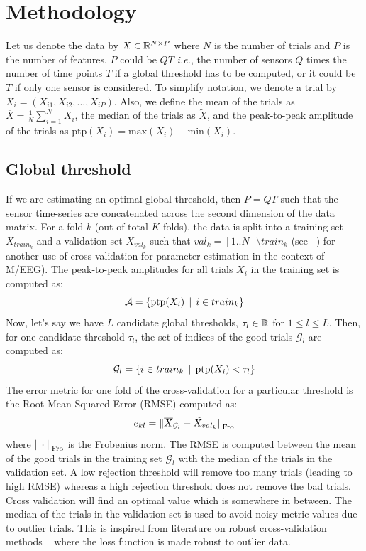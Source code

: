 \section{Methodology}
\label{sec:pagestyle}
Let us denote the data by $X \in \mathbb{R}^{N \times P}$ where $N$ is the number of trials  and $P$ is the number of features. $P$ could be $QT$ \textit{i.e.}, the number of sensors $Q$ times the number of time points $T$ if a global threshold has to be computed, or it could be $T$ if only one sensor is considered. To simplify notation, we denote a trial by $X_{i} = (X_{i1}, X_{i2}, ..., X_{iP})$. Also, we define the mean of the trials as  $\overline{X} = \frac{1}{N} \sum_{i=1}^{N} X_{i}$, the median of the trials as $\widetilde{X}$, and the peak-to-peak amplitude of the trials as  $\mathrm{ptp}(X_i) = \mathrm{max}(X_i) - \mathrm{min}(X_i)$.

\subsection{Global threshold}
\label{sec:cv_basic}
If we are estimating an optimal global threshold, then $P=QT$ such that the sensor time-series are concatenated across the second dimension of the data matrix. For a fold $k$ (out of total $K$ folds), the data is split into a training set $X_{{train}_{k}}$ and a validation set $X_{{val}_{k}}$ such that ${val}_{k} = [1 .. N] \setminus {train}_{k}$  (see ~\citep{Engemann2015328}) for another use of cross-validation for parameter estimation in the context of M/EEG). The peak-to-peak amplitudes for all trials $X_i$ in the training set is computed as:
\begin{equation}
	\mathcal{A} = \{\mathrm{ptp}(X_i) \, \mid \, i \in {train}_{k}\}
\end{equation}
Now, let's say we have $L$ candidate global thresholds, $\tau_l \in \mathbb{R}$ for $1 \leq l \leq L$. Then, for one candidate threshold $\tau_l$, the set of indices of the good trials $\mathcal{G}_{l}$ are computed as:
\begin{equation}
\mathcal{G}_{l} = \{i \in {train}_{k} \, \mid \, \mathrm{ptp}(X_i) < \tau_{l}\}
\end{equation}
The error metric for one fold of the cross-validation for a particular threshold is the Root Mean Squared Error (RMSE) computed as:
\begin{equation}
\label{eq:error_metric}
e_{kl} = {\| \overline{X}_{\mathcal{G}_{l}} - \widetilde{X}_{val_k} \|}_{\mathrm{Fro}}
\end{equation}
where ${\| \cdot \|}_{\mathrm{Fro}}$ is the Frobenius norm. The RMSE is computed between the mean of the good trials in the training set $\mathcal{G}_{l}$ with the median of the trials in the validation set. A low rejection threshold will remove too many trials (leading to high RMSE) whereas a high rejection threshold does not remove the bad trials. Cross validation will find an optimal value which is somewhere in between. The median of the trials in the validation set is used to avoid noisy metric values due to outlier trials. This is inspired from literature on robust cross-validation methods ~\citep{leung2005cross, de2003robust} where the loss function is made robust to outlier data.

